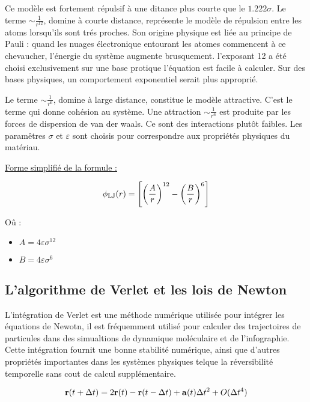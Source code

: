 Ce modèle est fortement répulsif à une ditance plus courte que le $1.222 \sigma$.
Le terme  $\sim \frac{1}{r^{12}}$, domine à courte distance, représente le modèle de répulsion entre les atoms lorsqu'ils sont trés proches. Son origine physique est liée au principe de Pauli :  quand les nuages électronique entourant les atomes commencent à ce chevaucher, l'énergie du système augmente brusquement. l'exposant 12 a été choisi exclusivement sur une base protique l'équation est facile à calculer. Sur des bases physiques, un comportement exponentiel serait plus approprié.

Le terme   $\sim \frac{1}{r^{6}}$, domine à large distance, constitue le modèle attractive. C'est le terme qui donne cohésion au système. Une attraction  $\sim \frac{1}{r^{6}}$ est produite par les forces de dispersion de van der waals. Ce sont des interactions plutôt faibles.
Les paramêtres $\sigma$ et $\varepsilon$ sont choisis pour correspondre aux propriétés physiques du matériau.

\underline{Forme simplifié de la formule :}


 \begin{displaymath}
 \phi_{\rm LJ} (r) =  \left[ \left(\frac{A}{r}\right)^{12} - \left(\frac{B}{r}\right)^{6} \right]\end{displaymath}

Oû :
\begin{itemize}
    \item $ A = 4 \varepsilon \sigma ^{12}$
    \item $ B = 4 \varepsilon \sigma ^{6}$
\end{itemize}

\subsection{L'algorithme de Verlet et les lois de Newton}

L'intégration de Verlet est une méthode numérique utilisée pour intégrer les équations de Newotn, il est fréquemment utilisé pour calculer des trajectoires de particules dans des simualtions de dynamique moléculaire et de l'infographie.
Cette intégration fournit une bonne stabilité numérique, ainsi que d'autres propriétés importantes dans les systèmes physiques telque la réversibilité temporelle sans cout de calcul supplémentaire.

\begin{displaymath} {\bf r} (t+\Delta t) = 2{\bf r} (t) - {\bf r} (t-\Delta t) + {\bf a} (t) \Delta t^2 + O(\Delta t^4) \end{displaymath}

